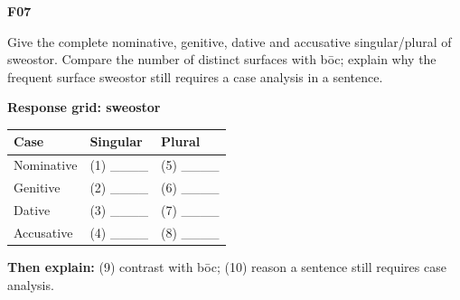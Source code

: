 \par\begin{minipage}{\linewidth}\raggedright
\textbf{F07}

Give the complete nominative, genitive, dative and accusative singular/\allowbreak{}plural of sweostor. Compare the number of distinct surfaces with bōc; explain why the frequent surface sweostor still requires a case analysis in a sentence.

\textbf{Response grid: sweostor}

\par\begingroup
\fontsize{10.5}{13.2}\selectfont
\setlength{\LTleft}{0pt}\setlength{\LTright}{\fill}
\noindent
\begin{tabular}{@{}>{\raggedright\arraybackslash}p{39.46mm}>{\raggedright\arraybackslash}p{39.46mm}>{\raggedright\arraybackslash}p{39.46mm}@{}}
\toprule
\textbf{Case} & \textbf{Singular} & \textbf{Plural} \\
\midrule
Nominative & (1) \_\_\_\_ & (5) \_\_\_\_ \\
Genitive & (2) \_\_\_\_ & (6) \_\_\_\_ \\
Dative & (3) \_\_\_\_ & (7) \_\_\_\_ \\
Accusative & (4) \_\_\_\_ & (8) \_\_\_\_ \\
\bottomrule
\end{tabular}
\par\endgroup

\textbf{Then explain:} (9) contrast with bōc; (10) reason a sentence still requires case analysis.

\end{minipage}\par\addvspace{4pt}

